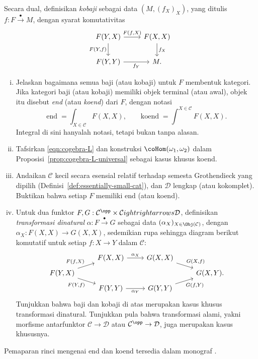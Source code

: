 \begin{Exercises}
	Secara dual, definisikan \emph{kobaji} sebagai data $(M,(f_X)_X)$,
	yang ditulis $f:F\xrightarrow{\bullet}M$, dengan syarat komutativitas
	\[\begin{tikzcd}
		F(Y, X) \arrow[r, "{F(f, X)}"] \arrow[d, "{F(Y, f)}"'] & F(X, X) \arrow[d, "{f_X}"] \\
		F(Y, Y) \arrow[r, "{f_Y}"'] & M.
	\end{tikzcd}\]
	\begin{enumerate}[(i)]
		\item Jelaskan bagaimana semua baji (atau kobaji) untuk $F$ membentuk
		kategori. Jika kategori baji (atau kobaji) memiliki objek terminal
		(atau awal), objek itu disebut \emph{end} (atau \emph{koend}) dari
		$F$, dengan notasi
		\[ \text{end}\;=\int_{X\in\mathcal{C}}F(X,X),\qquad
		\text{koend}\;=\int^{X\in\mathcal{C}}F(X,X). \]
		Integral di sini hanyalah notasi, tetapi bukan tanpa alasan.
		\item Tafsirkan \eqref{eqn:cogebra-L} dan konstruksi
		$\coHom(\omega_1,\omega_2)$ dalam
		Proposisi~\ref{prop:cogebra-L-universal} sebagai kasus khusus koend.
		\item Andaikan $\mathcal{C}$ kecil secara esensial relatif terhadap
		semesta Grothendieck yang dipilih
		(Definisi~\ref{def:essentially-small-cat}), dan $\mathcal{D}$ lengkap
		(atau kokomplet). Buktikan bahwa setiap $F$ memiliki end (atau koend).
		\item Untuk dua funktor
		$F,G:\mathcal{C}^{\opp}\times\mathcal{C}
ightrightarrows
		\mathcal{D}$, definisikan \emph{transformasi dinatural}
		$\alpha:F\xrightarrow{\bullet}G$ sebagai data
		$(\alpha_X)_{X\in\Obj(\mathcal{C})}$, dengan
		$\alpha_X:F(X,X)\to G(X,X)$, sedemikian rupa sehingga diagram berikut
		komutatif untuk setiap $f:X\to Y$ dalam $\mathcal{C}$:
		\[\begin{tikzcd}[row sep=tiny]
			& F(X, X) \arrow[r, "{\alpha_X}"] & G(X, X) \arrow[rd, "{G(X, f)}"] & \\
			F(Y, X) \arrow[ru, "{F(f, X)}"] \arrow[rd, "{F(Y, f)}"'] & & & G(X, Y). \\
			& F(Y, Y) \arrow[r, "{\alpha_Y}"'] & G(Y, Y) \arrow[ru, "{G(f, Y)}"'] &
		\end{tikzcd}\]
		Tunjukkan bahwa baji dan kobaji di atas merupakan kasus khusus
		transformasi dinatural. Tunjukkan pula bahwa transformasi alami, yakni
		morfisme antarfunktor $\mathcal{C}\to\mathcal{D}$ atau
		$\mathcal{C}^{\opp}\to\mathcal{D}$, juga merupakan kasus khususnya.
	\end{enumerate}
	Pemaparan rinci mengenai end dan koend tersedia dalam monograf
	\cite{Lor21}.


\end{Exercises}
